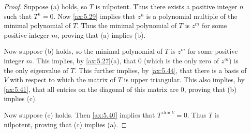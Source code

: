 \begin{proof}
Suppose (a) holds, so $T$ is nilpotent. Thus there exists a positive integer
$n$ such that $T^n=0$. Now \ref{ax:5.29} implies that $z^n$ is a polynomial
multiple of the minimal polynomial of $T$. Thus the minimal polynomial of $T$
is $z^m$ for some positive integer $m$, proving that (a) implies (b).

Now suppose (b) holds, so the minimal polynomial of $T$ is $z^m$ for some
positive integer $m$. This implies, by \ref{ax:5.27}(a), that $0$ (which is the
only zero of $z^m$) is the only eigenvalue of $T$. This further implies, by
\ref{ax:5.44}, that there is a basis of $V$ with respect to which the matrix of
$T$ is upper triangular. This also implies, by \ref{ax:5.41}, that all entries
on the diagonal of this matrix are $0$, proving that (b) implies (c).

Now suppose (c) holds. Then \ref{ax:5.40} implies that $T^{\dim V}=0$. Thus $T$
is nilpotent, proving that (c) implies (a).
\end{proof}

